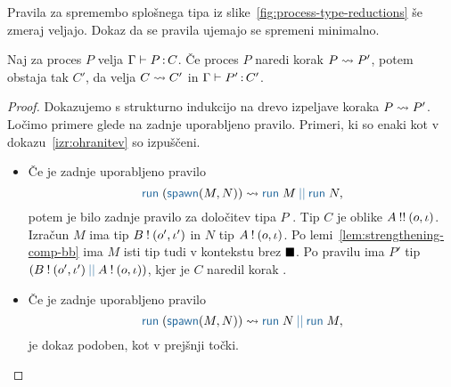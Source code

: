 Pravila za spremembo splošnega tipa iz slike~\ref{fig:process-type-reductions} še zmeraj veljajo. Dokaz da se pravila ujemajo se spremeni minimalno.


\begin{izrek}[o ohranitvi]\label{izr:ohranitev-2}
	Naj za proces $P$ velja $\Gamma \vdash P \mathinner{:} C$. Če proces $P$ naredi korak $P \leadsto P'$, potem obstaja tak $C'$, da velja $C \rightsquigarrow C'$ in $\Gamma \vdash P' \mathinner{:} C'$.
\end{izrek}


\begin{proof}
	Dokazujemo s strukturno indukcijo na drevo izpeljave koraka $P \leadsto P'$.
	Ločimo primere glede na zadnje uporabljeno pravilo.
	Primeri, ki so enaki kot v dokazu~\ref{izr:ohranitev} so izpuščeni.
	
	\begin{itemize}
		
		\item Če je zadnje uporabljeno pravilo
		$$\tmrun{(\tmspawn{M}{N})} \reduces \tmpar{\tmrun{M}}{\tmrun{N}},$$
		potem je bilo zadnje pravilo za določitev tipa $P$ . Tip $C$ je oblike $A \mathbin{!!} (o, \iota)$.
		Izračun $M$ ima tip $B \mathbin{!} (o', \iota')$ in $N$ tip $A \mathbin{!} (o, \iota)$.
		Po lemi~\ref{lem:strengthening-comp-bb} ima $M$ isti tip tudi v kontekstu brez $\blacksquare$.
		Po pravilu  ima $P'$ tip $\typar{\tycomp{B}{\o', \i'}}{\tycomp{A}{\o, \i}}$, kjer je $C$ naredil korak .
		
		\item Če je zadnje uporabljeno pravilo
		$$\tmrun{(\tmspawn{M}{N})} \reduces \tmpar{\tmrun{N}}{\tmrun{M}},$$
		je dokaz podoben, kot v prejšnji točki.
	\end{itemize}

\end{proof}



